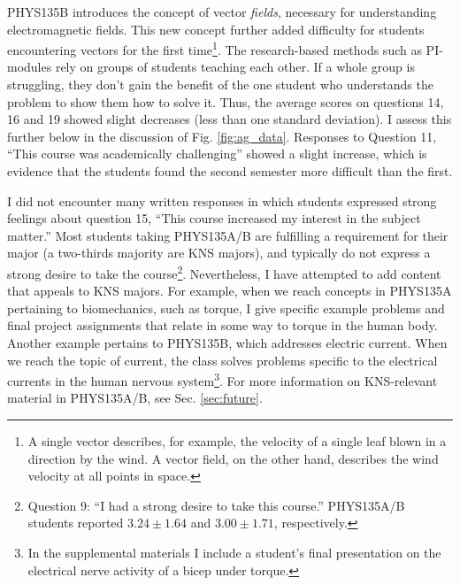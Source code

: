 \documentclass[../../main.tex]{subfiles}
\begin{document}
PHYS135B introduces the concept of vector \textit{fields}, necessary for understanding electromagnetic fields.  This new concept further added difficulty for students encountering vectors for the first time\footnote{A single vector describes, for example, the velocity of a single leaf blown in a direction by the wind.  A vector field, on the other hand, describes the wind velocity at all points in space.}.  The research-based methods such as PI-modules rely on groups of students teaching each other.  If a whole group is struggling, they don't gain the benefit of the one student who understands the problem to show them how to solve it.  Thus, the average scores on questions 14, 16 and 19 showed slight decreases (less than one standard deviation).  I assess this further below in the discussion of Fig. \ref{fig:ag_data}.  Responses to Question 11, ``This course was academically challenging'' showed a slight increase, which is evidence that the students found the second semester more difficult than the first.  \\ \hspace{0.1cm}

I did not encounter many written responses in which students expressed strong feelings about question 15, ``This course increased my interest in the subject matter.''  Most students taking PHYS135A/B are fulfilling a requirement for their major (a two-thirds majority are KNS majors), and typically do not express a strong desire to take the course\footnote{Question 9: ``I had a strong desire to take this course.'' PHYS135A/B students reported $3.24\pm 1.64$ and $3.00\pm 1.71$, respectively.}.  Nevertheless, I have attempted to add content that appeals to KNS majors.  For example, when we reach concepts in PHYS135A pertaining to biomechanics, such as torque, I give specific example problems and final project assignments that relate in some way to torque in the human body.  Another example pertains to PHYS135B, which addresses electric current.  When we reach the topic of current, the class solves problems specific to the electrical currents in the human nervous system\footnote{In the supplemental materials I include a student's final presentation on the electrical nerve activity of a bicep under torque.}.  For more information on KNS-relevant material in PHYS135A/B, see Sec. \ref{sec:future}. \\ \hspace{0.1cm}
\end{document}
